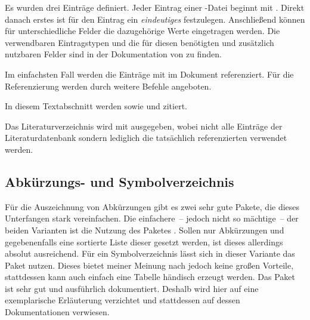 \documentclass[%
  english,ngerman,%
  geometry=no,DIV=12,automark,%
]{tudscrartcl}
\begin{document}
%
Es wurden drei Einträge definiert. Jeder Eintrag einer -Datei 
beginnt mit . Direkt danach erstes ist für den 
Eintrag ein \emph{eindeutiges}  festzulegen. Anschließend 
können für unterschiedliche Felder die dazugehörige Werte eingetragen werden. 
Die verwendbaren Eintragstypen und die für diesen benötigten und zusätzlich 
nutzbaren Felder sind in der Dokumentation von  zu finden.

Im einfachsten Fall werden die Einträge mit  im 
Dokument referenziert. Für die Referenzierung werden durch  
weitere Befehle angeboten.
%
\begin{Tutorial}
In diesem Textabschnitt werden \cite{knuth84} sowie \cite{goossens94} und 
\cite{hanisch14} zitiert.
\end{Tutorial}
%
Das Literaturverzeichnis wird mit  ausgegeben, wobei 
nicht alle Einträge der Literaturdatenbank sondern lediglich die tatsächlich 
referenzierten verwendet werden.
%
\begin{Tutorial*}
\printbibliography[heading=subbibliography]
\end{Tutorial*}
\begin{quoting}[rightmargin=0pt]
\vspace*{-\baselineskip}
\printbibliography[heading=subbibliography]
\end{quoting}


\subsection{Abkürzungs- und Symbolverzeichnis}
\label{sec:glossaries}
Für die Auszeichnung von Abkürzungen gibt es zwei sehr gute Pakete, die dieses 
Unterfangen stark vereinfachen. Die einfachere~-- jedoch nicht so mächtige~-- 
der beiden Varianten ist die Nutzung des Paketes . Sollen nur 
Abkürzungen und gegebenenfalls eine sortierte Liste dieser gesetzt werden, ist 
dieses allerdings absolut ausreichend. Für ein Symbolverzeichnis lässt sich in 
dieser Variante das Paket  nutzen. Dieses bietet meiner 
Meinung nach jedoch keine großen Vorteile, stattdessen kann auch einfach eine 
Tabelle händisch erzeugt werden. Das Paket  ist sehr gut und 
ausführlich dokumentiert. Deshalb wird hier auf eine exemplarische Erläuterung 
verzichtet und stattdessen auf dessen Dokumentationen verwiesen.
\end{document}
